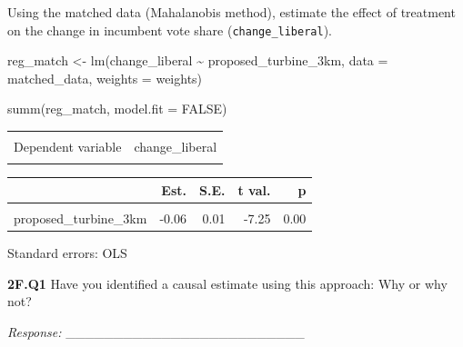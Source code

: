\documentclass[
  letterpaper,
  DIV=11,
  numbers=noendperiod]{scrartcl}
\newenvironment{Shaded}{\begin{snugshade}}{\end{snugshade}}
\newcommand{\AttributeTok}[1]{\textcolor[rgb]{0.40,0.45,0.13}{#1}}
\newcommand{\ConstantTok}[1]{\textcolor[rgb]{0.56,0.35,0.01}{#1}}
\newcommand{\FunctionTok}[1]{\textcolor[rgb]{0.28,0.35,0.67}{#1}}
\newcommand{\NormalTok}[1]{\textcolor[rgb]{0.00,0.23,0.31}{#1}}
\newcommand{\OtherTok}[1]{\textcolor[rgb]{0.00,0.23,0.31}{#1}}
\newcommand{\SpecialCharTok}[1]{\textcolor[rgb]{0.37,0.37,0.37}{#1}}
\begin{document}
Using the matched data (Mahalanobis method), estimate the effect of
treatment on the change in incumbent vote share
(\texttt{change\_liberal}).

\begin{Shaded}
\begin{Highlighting}[]
\NormalTok{reg\_match }\OtherTok{\textless{}{-}} \FunctionTok{lm}\NormalTok{(change\_liberal }\SpecialCharTok{\textasciitilde{}}\NormalTok{ proposed\_turbine\_3km,}
                    \AttributeTok{data =}\NormalTok{ matched\_data,}
                    \AttributeTok{weights =}\NormalTok{ weights)}

\FunctionTok{summ}\NormalTok{(reg\_match, }\AttributeTok{model.fit =} \ConstantTok{FALSE}\NormalTok{)}
\end{Highlighting}
\end{Shaded}

\begin{table}[!h]
\centering
\begin{tabular}{lr}
\toprule
\cellcolor{gray!10}{Observations} & \cellcolor{gray!10}{708}\\
Dependent variable & change\_liberal\\
\cellcolor{gray!10}{Type} & \cellcolor{gray!10}{OLS linear regression}\\
\bottomrule
\end{tabular}
\end{table}  \begin{table}[!h]
\centering
\begin{threeparttable}
\begin{tabular}{lrrrr}
\toprule
  & Est. & S.E. & t val. & p\\
\midrule
\cellcolor{gray!10}{(Intercept)} & \cellcolor{gray!10}{-0.07} & \cellcolor{gray!10}{0.01} & \cellcolor{gray!10}{-10.96} & \cellcolor{gray!10}{0.00}\\
proposed\_turbine\_3km & -0.06 & 0.01 & -7.25 & 0.00\\
\bottomrule
\end{tabular}
\begin{tablenotes}
\item Standard errors: OLS
\end{tablenotes}
\end{threeparttable}
\end{table}

\textbf{2F.Q1} Have you identified a causal estimate using this
approach: Why or why not?

\emph{Response:} \_\_\_\_\_\_\_\_\_\_\_\_\_\_\_\_\_\_\_\_\_\_\_\_\_
\end{document}
